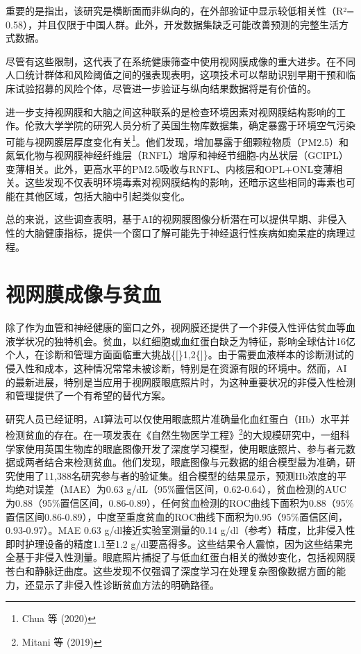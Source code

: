 \documentclass[
  Letterpaper,
]{scrbook}
\begin{document}
重要的是指出，该研究是横断面而非纵向的，在外部验证中显示较低相关性（R²=
0.58），并且仅限于中国人群。此外，开发数据集缺乏可能改善预测的完整生活方式数据。

尽管有这些限制，这代表了在系统健康筛查中使用视网膜成像的重大进步。在不同人口统计群体和风险阈值之间的强表现表明，这项技术可以帮助识别早期干预和临床试验招募的风险个体，尽管进一步验证与纵向结果数据将是有价值的。

进一步支持视网膜和大脑之间这种联系的是检查环境因素对视网膜结构影响的工作。伦敦大学学院的研究人员分析了英国生物库数据集，确定暴露于环境空气污染可能与视网膜层厚度变化有关\footnote{Chua
  等 (2020)}。他们发现，增加暴露于细颗粒物质（PM2.5）和氮氧化物与视网膜神经纤维层（RNFL）增厚和神经节细胞-内丛状层（GCIPL）变薄相关。此外，更高水平的PM2.5吸收与RNFL、内核层和OPL+ONL变薄相关。这些发现不仅表明环境毒素对视网膜结构的影响，还暗示这些相同的毒素也可能在其他区域，包括大脑中引起类似变化。

总的来说，这些调查表明，基于AI的视网膜图像分析潜在可以提供早期、非侵入性的大脑健康指标，提供一个窗口了解可能先于神经退行性疾病如痴呆症的病理过程。

\section{视网膜成像与贫血}\label{ux89c6ux7f51ux819cux6210ux50cfux4e0eux8d2bux8840}

除了作为血管和神经健康的窗口之外，视网膜还提供了一个非侵入性评估贫血等血液学状况的独特机会。贫血，以红细胞或血红蛋白缺乏为特征，影响全球估计16亿个人，在诊断和管理方面面临重大挑战\{{[}\}1,2\{{]}\}。由于需要血液样本的诊断测试的侵入性和成本，这种情况常常未被诊断，特别是在资源有限的环境中。然而，AI的最新进展，特别是当应用于视网膜眼底照片时，为这种重要状况的非侵入性检测和管理提供了一个有希望的替代方案。

研究人员已经证明，AI算法可以仅使用眼底照片准确量化血红蛋白（Hb）水平并检测贫血的存在。在一项发表在《自然生物医学工程》\footnote{Mitani
  等 (2019)}的大规模研究中，一组科学家使用英国生物库的眼底图像开发了深度学习模型，使用眼底照片、参与者元数据或两者结合来检测贫血。他们发现，眼底图像与元数据的组合模型最为准确，研究使用了11,388名研究参与者的验证集。组合模型的结果显示，预测Hb浓度的平均绝对误差（MAE）为0.63
g/dL（95\%置信区间，0.62-0.64），贫血检测的AUC为0.88（95\%置信区间，0.86-0.89），任何贫血检测的ROC曲线下面积为0.88（95\%置信区间0.86-0.89），中度至重度贫血的ROC曲线下面积为0.95（95\%置信区间，0.93-0.97）。MAE
0.63 g/dl接近实验室测量的0.14
g/dl（参考）精度，比非侵入性即时护理设备的精度1.1至1.2
g/dl要高得多。这些结果令人震惊，因为这些结果完全基于非侵入性测量。眼底照片捕捉了与低血红蛋白相关的微妙变化，包括视网膜苍白和静脉迂曲度。这些发现不仅强调了深度学习在处理复杂图像数据方面的能力，还显示了非侵入性诊断贫血方法的明确路径。
\end{document}
